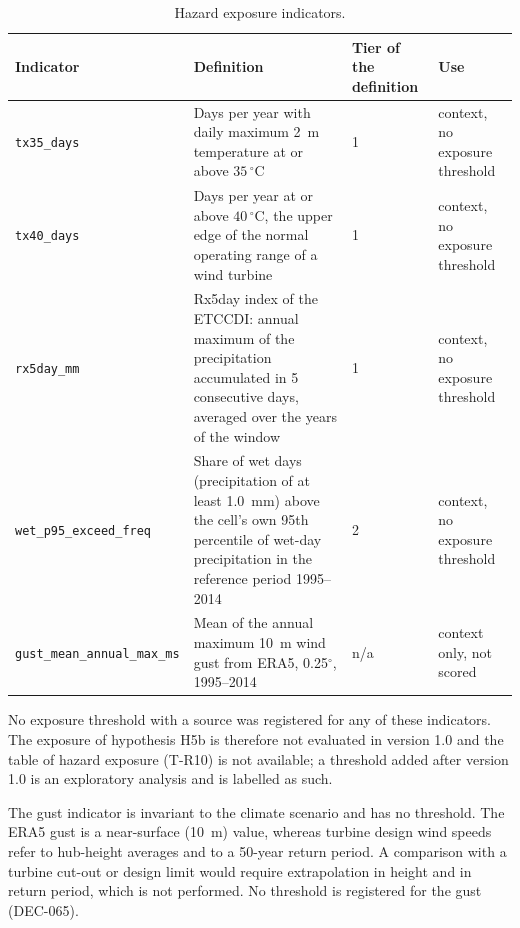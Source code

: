 \begin{table}[ht]
\centering
\caption{Hazard exposure indicators.}
\label{tab:g5-ind}
\small
\begin{tabular}{p{2.6cm}p{5.2cm}p{1.9cm}p{2.9cm}}
\toprule
Indicator & Definition & Tier of the definition & Use \\
\midrule
\texttt{tx35\_days} & Days per year with daily maximum 2~m temperature at or above $35\,^{\circ}\mathrm{C}$ & 1 & context, no exposure threshold \\
\texttt{tx40\_days} & Days per year at or above $40\,^{\circ}\mathrm{C}$, the upper edge of the normal operating range of a wind turbine & 1 & context, no exposure threshold \\
\texttt{rx5day\_mm} & Rx5day index of the ETCCDI: annual maximum of the precipitation accumulated in 5 consecutive days, averaged over the years of the window \citep{zhang2011indices} & 1 & context, no exposure threshold \\
\texttt{wet\_p95\_exceed\_freq} & Share of wet days (precipitation of at least 1.0~mm) above the cell's own 95th percentile of wet-day precipitation in the reference period 1995--2014 & 2 & context, no exposure threshold \\
\texttt{gust\_mean\_annual\_max\_ms} & Mean of the annual maximum 10~m wind gust from ERA5, 0.25$^{\circ}$, 1995--2014 & n/a & context only, not scored \\
\bottomrule
\end{tabular}
\end{table}

No exposure threshold with a source was registered for any of these indicators. The exposure of hypothesis H5b is therefore not evaluated in version 1.0 and the table of hazard exposure (T-R10) is not available; a threshold added after version 1.0 is an exploratory analysis and is labelled as such.

The gust indicator is invariant to the climate scenario and has no threshold. The ERA5 gust is a near-surface (10~m) value, whereas turbine design wind speeds refer to hub-height averages and to a 50-year return period. A comparison with a turbine cut-out or design limit would require extrapolation in height and in return period, which is not performed. No threshold is registered for the gust (DEC-065).

